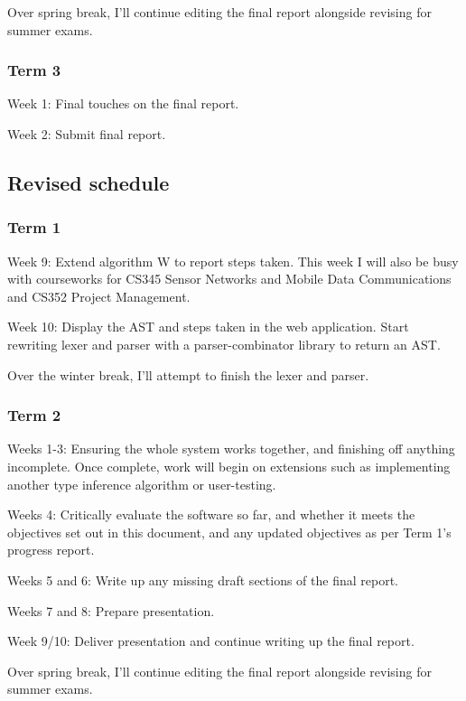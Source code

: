 \documentclass[12pt]{article}
\begin{document}
Over spring break, I’ll continue editing the final report alongside revising for summer exams.

\subsubsection{Term 3}

Week 1: Final touches on the final report.

Week 2: Submit final report.

\subsection{Revised schedule}

\subsubsection{Term 1}

Week 9: Extend algorithm W to report steps taken. This week I will also be busy with courseworks for CS345 Sensor Networks and Mobile Data Communications and CS352 Project Management.

Week 10: Display the AST and steps taken in the web application. Start rewriting lexer and parser with a parser-combinator library to return an AST.

Over the winter break, I’ll attempt to finish the lexer and parser.

\subsubsection{Term 2}

Weeks 1-3: Ensuring the whole system works together, and finishing off anything incomplete. Once complete, work will begin on extensions such as implementing another type inference algorithm or user-testing.

Weeks 4: Critically evaluate the software so far, and whether it meets the objectives set out in this document, and any updated objectives as per Term 1’s progress report.

Weeks 5 and 6: Write up any missing draft sections of the final report.

Weeks 7 and 8: Prepare presentation.

Week 9/10: Deliver presentation and continue writing up the final report.

Over spring break, I’ll continue editing the final report alongside revising for summer exams.
\end{document}
